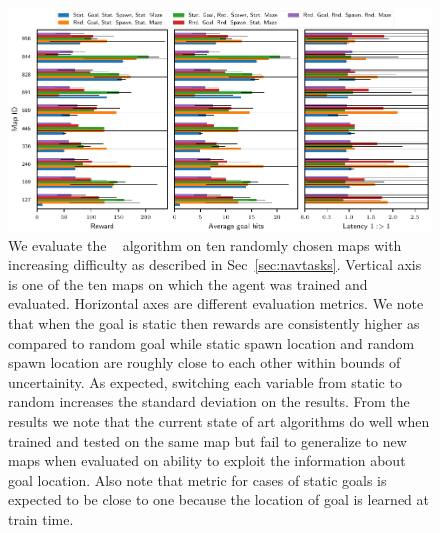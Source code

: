 \begin{figure}%
  \includegraphics[width=\linewidth]{images/plot_summary_bar_plots.pdf}%
  \vspace{-1em}%
  \caption{
    We evaluate the \NavAiiiCDiDiiL{}~\cite{MiPaViICLR2017} algorithm on ten randomly chosen maps with increasing difficulty as described in Sec~\ref{sec:navtasks}.
  Vertical axis is one of the ten maps on which the agent was trained and evaluated.
  Horizontal axes are different evaluation metrics.
  We note that when the goal is static then rewards are consistently higher as compared to random goal while static spawn location and random spawn location are roughly close to each other within bounds of uncertainity. As expected, switching each variable from static to random increases the standard deviation on the results.
  From the \LatencyOneGtOne{} results we note that the current state of art algorithms do well when trained and tested on the same map but fail to generalize to new maps when evaluated on ability to exploit the information about goal location.
  Also note that \LatencyOneGtOne{} metric for cases of static goals is expected to be close to one because the location of goal is learned at train time.
  }%
\label{fig:latency-goal-reward}%
\end{figure}

